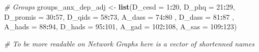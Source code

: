 \documentclass[
]{article}
\newenvironment{Shaded}{\begin{snugshade}}{\end{snugshade}}
\newcommand{\AttributeTok}[1]{\textcolor[rgb]{0.13,0.29,0.53}{#1}}
\newcommand{\CommentTok}[1]{\textcolor[rgb]{0.56,0.35,0.01}{\textit{#1}}}
\newcommand{\DecValTok}[1]{\textcolor[rgb]{0.00,0.00,0.81}{#1}}
\newcommand{\FunctionTok}[1]{\textcolor[rgb]{0.13,0.29,0.53}{\textbf{#1}}}
\newcommand{\NormalTok}[1]{#1}
\newcommand{\OtherTok}[1]{\textcolor[rgb]{0.56,0.35,0.01}{#1}}
\newcommand{\SpecialCharTok}[1]{\textcolor[rgb]{0.81,0.36,0.00}{\textbf{#1}}}
\begin{document}
\begin{Shaded}
\begin{Highlighting}[]
\CommentTok{\# Groups}
\NormalTok{groups\_anx\_dep\_adj }\OtherTok{\textless{}{-}} \FunctionTok{list}\NormalTok{(}\AttributeTok{D\_cesd =} \DecValTok{1}\SpecialCharTok{:}\DecValTok{20}\NormalTok{, }\AttributeTok{D\_phq =} \DecValTok{21}\SpecialCharTok{:}\DecValTok{29}\NormalTok{, }\AttributeTok{D\_promis =} \DecValTok{30}\SpecialCharTok{:}\DecValTok{57}\NormalTok{, }\AttributeTok{D\_qids =} \DecValTok{58}\SpecialCharTok{:}\DecValTok{73}\NormalTok{, }\AttributeTok{A\_dass =} \DecValTok{74}\SpecialCharTok{:}\DecValTok{80}\NormalTok{ , }\AttributeTok{D\_dass =} \DecValTok{81}\SpecialCharTok{:}\DecValTok{87}\NormalTok{ , }\AttributeTok{A\_hads =} \DecValTok{88}\SpecialCharTok{:}\DecValTok{94}\NormalTok{, }\AttributeTok{D\_hads =} \DecValTok{95}\SpecialCharTok{:}\DecValTok{101}\NormalTok{, }\AttributeTok{A\_gad =} \DecValTok{102}\SpecialCharTok{:}\DecValTok{108}\NormalTok{, }\AttributeTok{A\_sas =} \DecValTok{109}\SpecialCharTok{:}\DecValTok{123}\NormalTok{)}

\CommentTok{\# To be more readable on Network Graphs here is a vector of shortenned names}


\end{Highlighting}
\end{Shaded}
\end{document}
